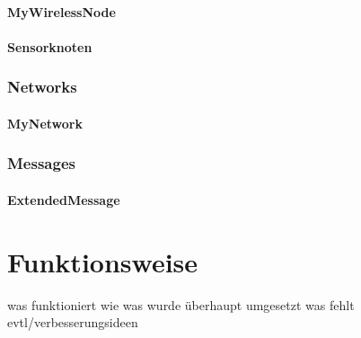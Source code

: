 \paragraph{MyWirelessNode}



\paragraph{Sensorknoten}

\subsubsection{Networks}

\paragraph{MyNetwork}

\subsubsection{Messages}

\paragraph{ExtendedMessage}

\section{Funktionsweise}

was funktioniert wie
was wurde überhaupt umgesetzt
was fehlt evtl/verbesserungsideen